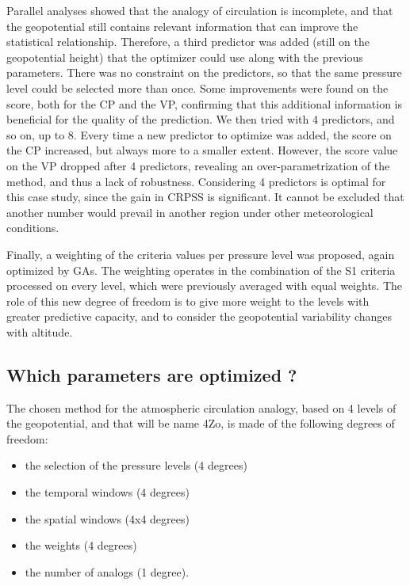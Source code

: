 \documentclass[review]{elsarticle}
\begin{document}
Parallel analyses showed that the analogy of circulation is incomplete, and that the geopotential still contains relevant information that can improve the statistical relationship. Therefore, a third predictor was added (still on the geopotential height) that the optimizer could use along with the previous parameters. There was no constraint on the predictors, so that the same pressure level could be selected more than once. Some improvements were found on the score, both for the CP and the VP, confirming that this additional information is beneficial for the quality of the prediction. We then tried with 4 predictors, and so on, up to 8. Every time a new predictor to optimize was added, the score on the CP increased, but always more to a smaller extent. However, the score value on the VP dropped after 4 predictors, revealing an over-parametrization of the method, and thus a lack of robustness. Considering 4 predictors is optimal for this case study, since the gain in CRPSS is significant. It cannot be excluded that another number would prevail in another region under other meteorological conditions.

Finally, a weighting of the criteria values per pressure level was proposed, again optimized by GAs. The weighting operates in the combination of the S1 criteria processed on every level, which were previously averaged with equal weights. The role of this new degree of freedom is to give more weight to the levels with greater predictive capacity, and to consider the geopotential variability changes with altitude. 


\subsection{Which parameters are optimized ?}

The chosen method for the atmospheric circulation analogy, based on 4 levels of the geopotential, and that will be name 4Zo, is made of the following degrees of freedom:

\begin{itemize}
	\setlength\itemsep{-4px}
	\item the selection of the pressure levels (4 degrees)
	\item the temporal windows (4 degrees)
	\item the spatial windows (4x4 degrees)
	\item the weights (4 degrees)
	\item the number of analogs (1 degree).
\end{itemize}
\end{document}
